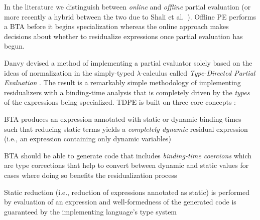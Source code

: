 \documentclass[a4paper,12pt,twoside,openright]{report}
\newenvironment{tight_enumerate}{
\begin{enumerate}
  \setlength{\itemsep}{0pt}
  \setlength{\parskip}{0pt}
}{\end{enumerate}}
\theoremstyle{definition}
\begin{document}


In the literature we distinguish between \textit{online} and \textit{offline} partial evaluation \cite{jones1993partial} (or more recently a hybrid between the two due to Shali et al.~\cite{shali2011hybrid}). Offline PE performs a BTA before it begins specialization whereas the online approach makes decisions about whether to residualize expressions once partial evaluation has begun.

Danvy devised a method of implementing a partial evaluator solely based on the ideas of normalization in the simply-typed $\lambda$-calculus called \textit{Type-Directed Partial Evaluation} \cite{danvy1999type}. The result is a remarkably simple methodology of implementing residualizers with a binding-time analysis that is completely driven by the \textit{types} of the expressions being specialized. TDPE is built on three core concepts \cite{danvy1997online,grobauer2001second}:
\begin{tight_enumerate}
    \item BTA produces an expression annotated with static or dynamic binding-times such that reducing static terms yields a \textit{completely dynamic} residual expression (i.e., an expression containing only dynamic variables)
    \item BTA should be able to generate code that includes \textit{binding-time coercions} which are type corrections that help to convert between dynamic and static values for cases where doing so benefits the residualization process
    \item Static reduction (i.e., reduction of expressions annotated as static) is performed by evaluation of an expression and well-formedness of the generated code is guaranteed by the implementing language's type system
\end{tight_enumerate}
\end{document}
